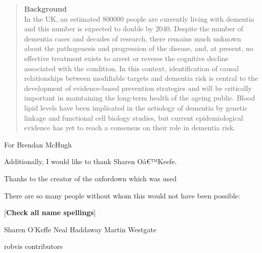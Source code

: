 \documentclass[a4paper, twoside]{templates/ociamthesis}
\begin{document}
\begin{romanpages}

\maketitle

\begin{abstract}
	\textbf{Background}\\
 In the UK, an estimated 800000 people are currently living with dementia and this number is expected to double
 by 2040. Despite the number of dementia cases and decades of research, there remains much unknown about
 the pathogenesis and progression of the disease, and, at present, no effective treatment exists to arrest or
 reverse the cognitive decline associated with the condition. In this context, identification of causal relationships
 between modifiable targets and dementia risk is central to the development of evidence-based prevention
 strategies and will be critically important in maintaining the long-term health of the ageing public. Blood lipid
 levels have been implicated in the aetiology of dementia by genetic linkage and functional cell biology studies,
 but current epidemiological evidence has yet to reach a consensus on their role in dementia risk.
\end{abstract}

\begin{dedication}
  For Brendan McHugh
\end{dedication}

\begin{acknowledgements}
 	Additionally, I would like to thank Sharen Oâ€™Keefe.

  Thanks to the creator of the oxfordown which was used

  There are so many people without whom this would not have been possible:

  {[}\textbf{Check all name spellings}{]}

  Sharen O'Keffe
  Neal Haddaway
  Martin Westgate

  robvis contributors


\end{acknowledgements}
\end{romanpages}
\end{document}
